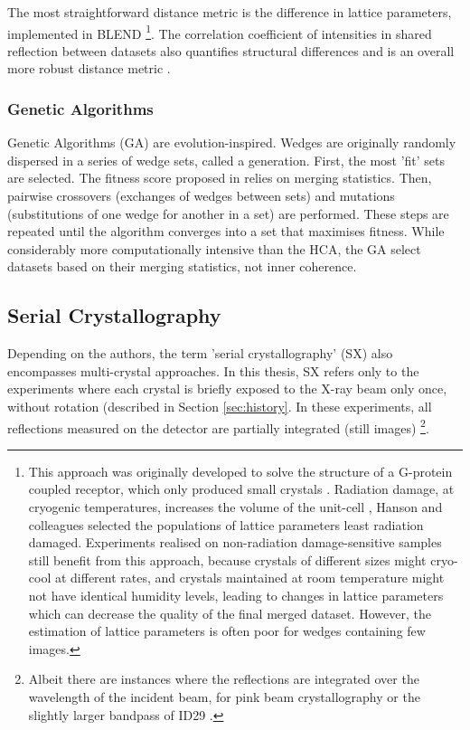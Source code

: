 The most straightforward distance metric is the difference in lattice parameters, implemented in BLEND \parencite{foadiClusteringProceduresOptimal2013} \footnote{This approach was originally developed to solve the structure of a G-protein coupled receptor, which only produced small crystals \parencite{hansonCrystalStructureLipid2012}. Radiation damage, at cryogenic temperatures, increases the volume of the unit-cell \parencite{naveUnderstandingRadiationDamage2005}, Hanson and colleagues selected the populations of lattice parameters least radiation damaged. Experiments realised on non-radiation damage-sensitive samples still benefit from this approach, because crystals of different sizes might cryo-cool at different rates, and crystals maintained at room temperature might not have identical humidity levels, leading to changes in lattice parameters which can decrease the quality of the final merged dataset. However, the estimation of lattice parameters is often poor for wedges containing few images.}. The correlation coefficient of intensities in shared reflection between datasets also quantifies structural differences and is an overall more robust distance metric \parencite{giordanoApplicationHierarchicalCluster2012, zanderMeshAndCollectAutomatedMulticrystal2015, santoniHierarchicalClusteringMultiplecrystal2017, yamashitaKAMOAutomatedData2018}. 

\subsubsection{Genetic Algorithms} 

Genetic Algorithms (GA) are evolution-inspired. Wedges are originally randomly dispersed in a series of wedge sets, called a generation. First, the most 'fit' sets are selected. The fitness score proposed in \cite{zanderMergingSynchrotronSerial2016} relies on merging statistics. Then, pairwise crossovers (exchanges of wedges between sets) and mutations (substitutions of one wedge for another in a set) are performed. These steps are repeated until the algorithm converges into a set that maximises fitness. While considerably more computationally intensive than the HCA, the GA select datasets based on their merging statistics, not inner coherence. 

\subsection{Serial Crystallography}\label{sec:SX_intro}

Depending on the authors, the term 'serial crystallography' (SX) also encompasses multi-crystal approaches. In this thesis, SX refers only to the experiments where each crystal is briefly exposed to the X-ray beam only once, without rotation (described in Section \ref{sec:history}. In these experiments, all reflections measured on the detector are partially integrated (still images) \footnote{Albeit there are instances where the reflections are integrated over the wavelength of the incident beam, for pink beam crystallography \parencite{meentsPinkbeamSerialCrystallography2017} or the slightly larger bandpass of ID29 \parencite{griecoStructuralDynamicsFunctional2024}.}. 

